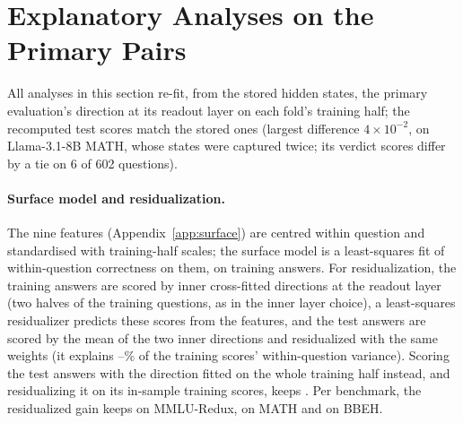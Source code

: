 \begin{table}[t]
\centering
\small

\caption{Held-out evaluation of the recipe. Eligible and Layer: whether the inner gap exceeded 5 points, and the chosen stretch layer, in each of the two folds. Verdict: ranking ($\times$100). Held out: gains over the verdict of the direction, the rule (stretch if eligible, else the verdict) and a random direction stretched at the chosen layer. Exploratory: gains with the layer chosen on the evaluated questions (--: not stretched there).}
\label{tab:outer}
\end{table}

\section{Explanatory Analyses on the Primary Pairs}
\label{app:explain}

All analyses in this section re-fit, from the stored hidden states, the primary evaluation's direction at its readout layer on each fold's training half; the recomputed test scores match the stored ones (largest difference $4\times10^{-2}$, on Llama-3.1-8B MATH, whose states were captured twice; its verdict scores differ by a tie on 6 of 602 questions).

\paragraph{Surface model and residualization.} The nine features (Appendix~\ref{app:surface}) are centred within question and standardised with training-half scales; the surface model is a least-squares fit of within-question correctness on them, on training answers. For residualization, the training answers are scored by inner cross-fitted directions at the readout layer (two halves of the training questions, as in the inner layer choice), a least-squares residualizer predicts these scores from the features, and the test answers are scored by the mean of the two inner directions and residualized with the same weights (it explains --\% of the training scores' within-question variance). Scoring the test answers with the direction fitted on the whole training half instead, and residualizing it on its in-sample training scores, keeps . Per benchmark, the residualized gain keeps  on MMLU-Redux,  on MATH and  on BBEH.

